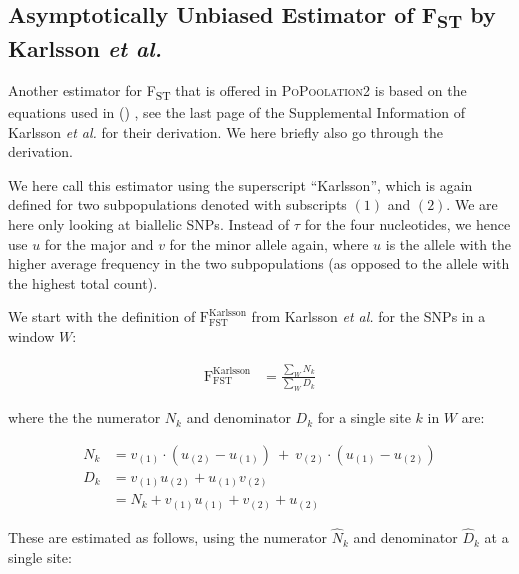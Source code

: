 \documentclass[a4paper,9pt,DIV=14]{scrartcl}
\newcommand\toolname{\textsc}
\newcommand{\fst}{F\textsubscript{ST}}
\newcommand\citeay[1]{\citeauthor{#1} (\citeyear{#1}) \cite{#1}}
\begin{document}

\subsection{Asymptotically Unbiased Estimator of \texorpdfstring{\fst}{FST} by Karlsson \textit{et al.}}
\label{supp:sec:FST:sub:Karlsson}

Another estimator for \fst{} that is offered in \toolname{PoPoolation2} is based on the equations used in \citeay{Karlsson2007}, see the last page of the Supplemental Information of Karlsson \textit{et al.} for their derivation.
We here briefly also go through the derivation.

We here call this estimator using the superscript ``Karlsson'', which is again defined for two subpopulations denoted with subscripts $(1)$ and $(2)$.
We are here only looking at biallelic SNPs.
Instead of $\tau$ for the four nucleotides, we hence use $u$ for the major and $v$ for the minor allele again, where $u$ is the allele with the higher average frequency in the two subpopulations (as opposed to the allele with the highest total count).

We start with the definition of $\text{F}_\text{FST}^\text{Karlsson}$ from Karlsson \textit{et al.} for the SNPs in a window $W$:

\begin{align}
    \label{eq:FstK}
    \text{F}_\text{FST}^\text{Karlsson} &= \frac{\sum_W N_k}{\sum_W D_k}
\end{align}

where the the numerator $N_k$ and denominator $D_k$ for a single site $k$ in $W$ are:

\begin{align}
    \label{eq:FstNk}
    N_k &= v_{(1)} \cdot ( u_{(2)} - u_{(1)} ) ~+~ v_{(2)} \cdot ( u_{(1)} - u_{(2)} ) \\
    \label{eq:FstDk}
    \nonumber
    D_k &= v_{(1)} u_{(2)} + u_{(1)} v_{(2)} \\
        &= N_k + v_{(1)} u_{(1)} + v_{(2)} + u_{(2)}
\end{align}

These are estimated as follows, using the numerator $\hat{N}_k$ and denominator $\hat{D}_k$ at a single site:
\end{document}
